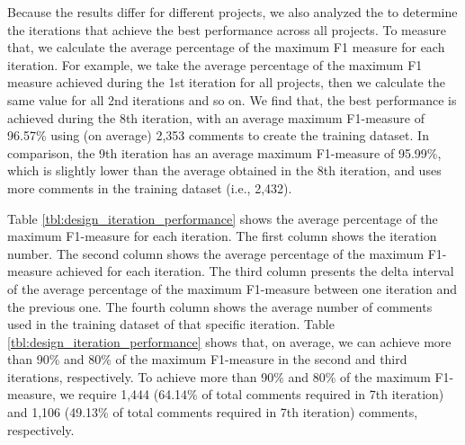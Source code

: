 
Because the results differ for different projects, we also analyzed the  to determine the iterations that achieve the best performance across all projects. To measure that, we calculate the average percentage of the maximum F1 measure for each iteration. For example, we take the average percentage of the maximum F1 measure achieved during the 1st iteration for all projects, then we calculate the same value for all 2nd iterations and so on. We find that, the best performance is achieved during the 8th iteration, with an average maximum F1-measure of 96.57\% using (on average) 2,353 comments to create the training dataset. In comparison, the 9th iteration has an average  maximum F1-measure of 95.99\%, which is slightly lower than the average obtained in the 8th iteration, and uses more comments in the training dataset (i.e., 2,432). 

Table \ref{tbl:design_iteration_performance} shows the average percentage of the maximum F1-measure for each iteration. The first column shows the iteration number. The second column shows the average percentage of the maximum F1-measure achieved for each iteration. The third column presents the delta interval of the average percentage of the maximum F1-measure between one iteration and the previous one. The fourth column shows the average number of comments used in the training dataset of that specific iteration. Table \ref{tbl:design_iteration_performance} shows that, on average, we can achieve more than 90\% and 80\% of the maximum F1-measure in the second and third iterations, respectively. To achieve more than 90\% and 80\% of the maximum F1-measure, we require 1,444 (64.14\% of total comments required in 7th iteration) and 1,106 (49.13\% of total comments required in 7th iteration) comments, respectively.

